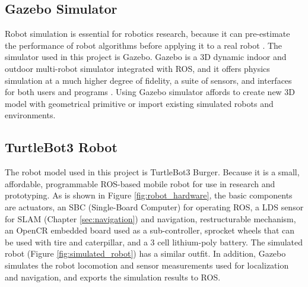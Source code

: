 \subsection{Gazebo Simulator}
Robot simulation is essential for robotics research, because it can pre-estimate the performance of robot algorithms before applying it to a real robot \cite{Afanasyev2015}. 
The simulator used in this project is Gazebo. Gazebo is a 3D dynamic indoor and outdoor multi-robot simulator integrated with ROS, and it offers physics simulation at a much higher degree of fidelity, a suite of sensors, and interfaces for both users and programs \cite{GZ}. 
Using Gazebo simulator affords to create new 3D model with geometrical primitive or import existing simulated robots and environments. 

\subsection{TurtleBot3 Robot}
The robot model used in this project is TurtleBot3 Burger. Because it is a small, affordable, programmable ROS-based mobile robot for use in research and prototyping. 
As is shown in Figure \ref{fig:robot_hardware}, the basic components are actuators, an SBC (Single-Board Computer) for operating ROS, a LDS sensor for SLAM (Chapter \ref{sec:navigation}) and navigation, restructurable mechanism, an OpenCR embedded board used as a sub-controller, sprocket wheels that can be used with tire and caterpillar, and a 3 cell lithium-poly battery.
The simulated robot (Figure  \ref{fig:simulated_robot}) has a similar outfit. In addition, Gazebo simulates the robot locomotion and sensor measurements used for localization and navigation, and exports the simulation results to ROS.


